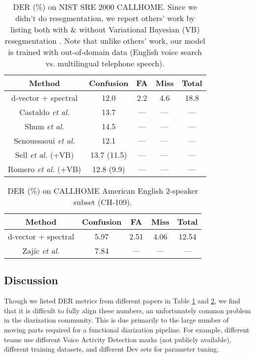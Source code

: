 \documentclass{article}
\begin{document}
\begin{table}
\centering
  \caption{DER (\%) on NIST SRE 2000 CALLHOME. Since we didn't do resegmentation, we report others' work by listing both with \& without Variational Bayesian (VB) resegmentation \cite{sell2015diarization}. Note that unlike others' work, our model is trained with out-of-domain data (English voice search vs. multilingual telephone speech).
  }
  \label{tab:der2}
  \begin{tabular}{| c | c c c c |}
    \hline
    \bf Method & \bf Confusion & \bf FA & \bf Miss & \bf Total \\ \hline
    d-vector + spectral & 12.0 & 2.2 & 4.6 & 18.8 \\
    Castaldo \textit{et al.} \cite{castaldo2008stream} & 13.7 & --- & ---  & --- \\
    Shum \textit{et al.} \cite{shum2013unsupervised} & 14.5 & --- & --- & --- \\
    Senoussaoui \textit{et al.} \cite{senoussaoui2014study} & 12.1 & --- & --- & --- \\
    Sell \textit{et al.} \cite{sell2015diarization} (+VB) & 13.7 (11.5) & --- & --- & --- \\
    Romero \textit{et al.} \cite{garcia2017speaker} (+VB) & 12.8 (9.9) & --- & --- & --- \\
    \hline
  \end{tabular}
\end{table}

\begin{table}
\centering
  \caption{DER (\%) on CALLHOME American English 2-speaker subset (CH-109).
  }
  \label{tab:der3}
  \begin{tabular}{| c | c c c c |}
    \hline
    \bf Method & \bf Confusion & \bf FA & \bf Miss & \bf Total \\ \hline
    d-vector + spectral & 5.97 & 2.51 & 4.06 & 12.54 \\
    Zaj{\'i}c \textit{et al.} \cite{zajic2017speaker} & 7.84 & --- & --- & --- \\
    \hline
  \end{tabular}
\end{table}


\subsection{Discussion}

Though we listed DER metrics from different papers in Table \ref{tab:der2} and \ref{tab:der3}, we find that it is difficult to fully align these numbers,
an unfortunately common problem in the diarization community.
This is due primarily to the large number of moving parts required for a functional diarization pipeline. For example, different teams
use different Voice Activity Detection marks (not publicly available), different training datasets, and different Dev sets for parameter tuning.
\end{document}
